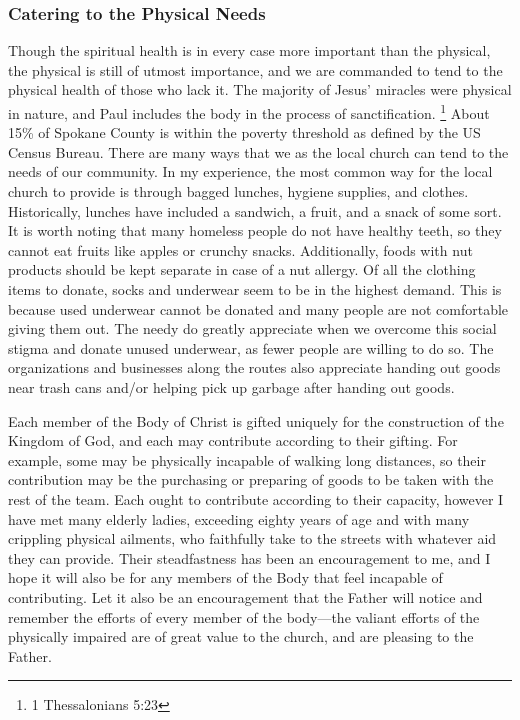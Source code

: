 \documentclass[12pt]{article}
\begin{document}
\subsubsection{Catering to the Physical Needs}

    \qJamesPhysical
    Though the spiritual health is in every case more important than the physical, the physical is still of utmost importance, and we are commanded to tend to the physical health of those who lack it.
    The majority of Jesus' miracles were physical in nature, and Paul includes the body in the process of sanctification.
    \footnote{1 Thessalonians 5:23}
    About 15\% of Spokane County is within the poverty threshold as defined by the US Census Bureau\cite{census}.
    There are many ways that we as the local church can tend to the needs of our community.
    In my experience, the most common way for the local church to provide is through bagged lunches, hygiene supplies, and clothes.
    Historically, lunches have included a sandwich, a fruit, and a snack of some sort.
    It is worth noting that many homeless people do not have healthy teeth, so they cannot eat fruits like apples or crunchy snacks.
    Additionally, foods with nut products should be kept separate in case of a nut allergy.
    Of all the clothing items to donate, socks and underwear seem to be in the highest demand.
    This is because used underwear cannot be donated and many people are not comfortable giving them out.
    The needy do greatly appreciate when we overcome this social stigma and donate unused underwear, as fewer people are willing to do so.
    The organizations and businesses along the routes also appreciate handing out goods near trash cans and/or helping pick up garbage after handing out goods.

    \qHebSix
    Each member of the Body of Christ is gifted uniquely for the construction of the Kingdom of God, and each may contribute according to their gifting.
    For example, some may be physically incapable of walking long distances, so their contribution may be the purchasing or preparing of goods to be taken with the rest of the team.
    Each ought to contribute according to their capacity, however I have met many elderly ladies, exceeding eighty years of age and with many crippling physical ailments, who faithfully take to the streets with whatever aid they can provide.
    Their steadfastness has been an encouragement to me, and I hope it will also be for any members of the Body that feel incapable of contributing.
    Let it also be an encouragement that the Father will notice and remember the efforts of every member of the body---the valiant efforts of the physically impaired are of great value to the church, and are pleasing to the Father.
\end{document}
